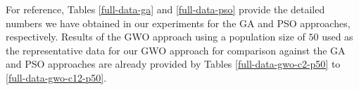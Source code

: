 For reference, Tables \ref{full-data-ga} and \ref{full-data-pso} provide the detailed numbers we have obtained in our experiments for the GA and PSO approaches, respectively. Results of the GWO approach using a population size of $50$ used as the representative data for our GWO approach for comparison against the GA and PSO approaches are already provided by Tables \ref{full-data-gwo-c2-p50} to \ref{full-data-gwo-c12-p50}.

\begin{table}
\centering
\begin{adjustwidth}{}{}
\end{adjustwidth}
\end{table}
